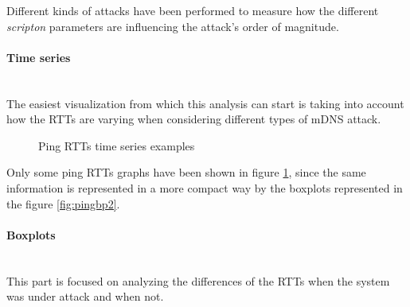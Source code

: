 \documentclass[fleqn, 11pt]{SelfArx} %
\begin{document}
Different kinds of attacks have been performed to measure how the different {\it{scripton}} parameters are influencing the attack's order of magnitude.

\paragraph{Time series}\mbox{}\\
The easiest visualization from which this analysis can start is taking into account how the RTTs are varying when considering different types of mDNS attack.

\begin{figure}
    \centering
    \qquad
    \caption{Ping RTTs time series examples}%
    \label{fig:rtts-time-series}%
\end{figure}
Only some ping RTTs graphs have been shown in figure \ref{fig:rtts-time-series}, since the same information is represented in a more compact way by the boxplots represented in the figure \ref{fig:pingbp2}.

\paragraph{Boxplots}\mbox{}\\
This part is focused on analyzing the differences of the RTTs when the system was under attack and when not.
\end{document}
